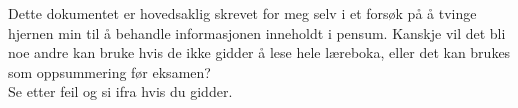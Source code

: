 Dette dokumentet er hovedsaklig skrevet for meg selv i et forsøk på å tvinge hjernen min til å behandle informasjonen inneholdt i pensum.
Kanskje vil det bli noe andre kan bruke hvis de ikke gidder å lese hele læreboka, eller det kan brukes som oppsummering før eksamen?
\\

Se etter feil og si ifra hvis du gidder.
